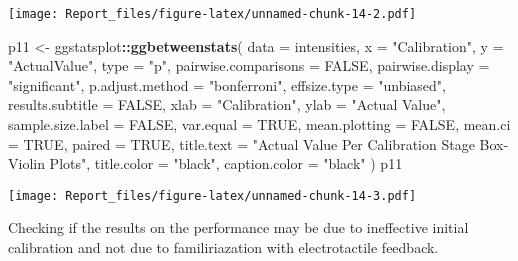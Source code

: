 \documentclass[
]{article}
\newenvironment{Shaded}{\begin{snugshade}}{\end{snugshade}}
\newcommand{\DataTypeTok}[1]{\textcolor[rgb]{0.13,0.29,0.53}{#1}}
\newcommand{\KeywordTok}[1]{\textcolor[rgb]{0.13,0.29,0.53}{\textbf{#1}}}
\newcommand{\NormalTok}[1]{#1}
\newcommand{\OperatorTok}[1]{\textcolor[rgb]{0.81,0.36,0.00}{\textbf{#1}}}
\newcommand{\OtherTok}[1]{\textcolor[rgb]{0.56,0.35,0.01}{#1}}
\newcommand{\StringTok}[1]{\textcolor[rgb]{0.31,0.60,0.02}{#1}}
\begin{document}
\texttt{[image: Report\_files/figure-latex/unnamed-chunk-14-2.pdf]}

\begin{Shaded}
\begin{Highlighting}[]
\NormalTok{p11 <-}\StringTok{ }\NormalTok{ggstatsplot}\OperatorTok{::}\KeywordTok{ggbetweenstats}\NormalTok{(}
  \DataTypeTok{data =}\NormalTok{ intensities,}
  \DataTypeTok{x =} \StringTok{"Calibration"}\NormalTok{,}
  \DataTypeTok{y =} \StringTok{"ActualValue"}\NormalTok{,}
  \DataTypeTok{type =} \StringTok{"p"}\NormalTok{,}
  \DataTypeTok{pairwise.comparisons =} \OtherTok{FALSE}\NormalTok{,}
  \DataTypeTok{pairwise.display =} \StringTok{"significant"}\NormalTok{,}
  \DataTypeTok{p.adjust.method =} \StringTok{"bonferroni"}\NormalTok{,}
  \DataTypeTok{effsize.type =} \StringTok{"unbiased"}\NormalTok{,}
  \DataTypeTok{results.subtitle =} \OtherTok{FALSE}\NormalTok{,}
  \DataTypeTok{xlab =} \StringTok{"Calibration"}\NormalTok{,}
  \DataTypeTok{ylab =} \StringTok{"Actual Value"}\NormalTok{,}
  \DataTypeTok{sample.size.label =} \OtherTok{FALSE}\NormalTok{,}
  \DataTypeTok{var.equal =} \OtherTok{TRUE}\NormalTok{,}
  \DataTypeTok{mean.plotting =} \OtherTok{FALSE}\NormalTok{,}
  \DataTypeTok{mean.ci =} \OtherTok{TRUE}\NormalTok{,}
  \DataTypeTok{paired =} \OtherTok{TRUE}\NormalTok{,}
  \DataTypeTok{title.text =} \StringTok{"Actual Value Per Calibration Stage Box-Violin Plots"}\NormalTok{,}
  \DataTypeTok{title.color =} \StringTok{"black"}\NormalTok{,}
  \DataTypeTok{caption.color =} \StringTok{"black"}
\NormalTok{  )}
\NormalTok{p11}
\end{Highlighting}
\end{Shaded}

\texttt{[image: Report\_files/figure-latex/unnamed-chunk-14-3.pdf]}

Checking if the results on the performance may be due to ineffective
initial calibration and not due to familiriazation with electrotactile
feedback.
\end{document}
